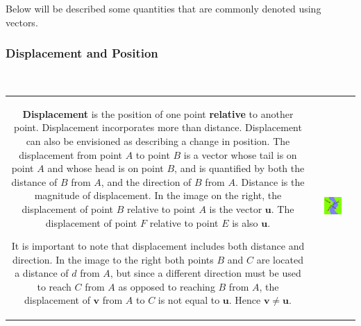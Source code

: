 \documentclass{article}
\begin{document}
Below will be described some quantities that are commonly denoted using vectors.

\subsubsection*{Displacement and Position}

~~

\begin{tabular}{cc}
\parbox{0.5\textwidth}{
{\bf Displacement} is the position of one point {\bf relative} to another point. Displacement incorporates more than distance. Displacement can also be envisioned as describing a change in position. The displacement from point \(A\) to point \(B\) is a vector whose tail is on point \(A\) and whose head is on point \(B\), and is quantified by both the distance of \(B\) from \(A\), and the direction of \(B\) from \(A\). Distance is the magnitude of displacement. In the image on the right, the displacement of point \(B\) relative to point \(A\) is the vector \(\mathbf{u}\). The displacement of point \(F\) relative to point \(E\) is also \(\mathbf{u}\). 

It is important to note that displacement includes both distance and direction. In the image to the right both points \(B\) and \(C\) are located a distance of \(d\) from \(A\), but since a different direction must be used to reach \(C\) from \(A\) as opposed to reaching \(B\) from \(A\), the displacement of \(\mathbf{v}\) from \(A\) to \(C\) is not equal to \(\mathbf{u}\). Hence \(\mathbf{v} \neq \mathbf{u}\). 
} & \parbox{0.5\textwidth}{
\includegraphics[width = 0.5\textwidth]{displacement_vs_distance}
} 
\end{tabular}
\end{document}
